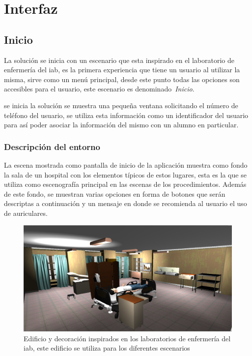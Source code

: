 \section{Interfaz}


\subsection{Inicio}

La solución se inicia con un escenario que esta inspirado en el laboratorio de
enfermería del \Gls{iab}, es la primera experiencia que tiene un
usuario al utilizar la misma, sirve como un menú principal, desde
este punto todas las opciones son accesibles para el usuario, este escenario es
denominado~\emph{Inicio}.

 se inicia la solución se muestra una pequeña ventana
solicitando el número de teléfono del usuario, se utiliza esta información como un
identificador del usuario para así poder asociar la información del mismo con un
alumno en particular.

\subsubsection{Descripción del entorno}
\label{sec:inicio_descripcion}


La escena mostrada como pantalla de inicio de la aplicación muestra como fondo
la sala de un hospital con los elementos típicos de estos lugares, esta es la
que se utiliza como escenografía principal en las escenas de los procedimientos.
Además de este fondo, se muestran varias opciones en forma de botones que serán
descriptas a continuación y un mensaje en donde se recomienda al usuario el uso
de auriculares.

\begin{figure}[H] 
\centering 
\includegraphics[scale=0.2]{solucion/images/sala.jpg}
\caption{Edificio y decoración inspirados en los laboratorios de enfermería del
    \Gls{iab}, este edificio se utiliza para los diferentes escenarios}
\label{fig:sala_perspectiva}
\end{figure}


